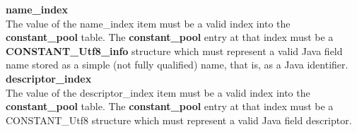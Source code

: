 \textbf{ name\_index} \\
The value of the name\_index item must be a valid index into the \textbf{constant\_pool} table. The \textbf{constant\_pool} entry at that index must be a \textbf{CONSTANT\_Utf8\_info} structure which must represent a valid Java field name stored as a simple (not fully qualified) name, that is, as a Java identifier. \\

\textbf{ descriptor\_index} \\
   The value of the descriptor\_index item must be a valid index into the \textbf{constant\_pool} table. The \textbf{constant\_pool} entry at that index must be a CONSTANT\_Utf8 structure which must represent a valid Java field descriptor.




